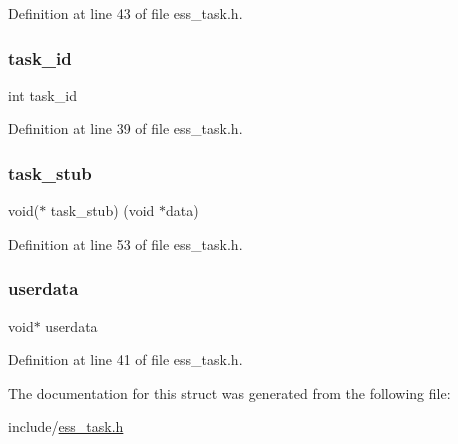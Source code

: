 Definition at line 43 of file ess\+\_\+task.\+h.

\mbox{\label{structess__platform__task_a24913131dc491a81c23f2b8246d85e3b}} 
\subsubsection{\texorpdfstring{task\+\_\+id}{task\_id}}
{\footnotesize\ttfamily int task\+\_\+id}



Definition at line 39 of file ess\+\_\+task.\+h.

\mbox{\label{structess__platform__task_a66859f9ee9fc430e9bf28644aea7c5c7}} 
\subsubsection{\texorpdfstring{task\+\_\+stub}{task\_stub}}
{\footnotesize\ttfamily void($\ast$  task\+\_\+stub) (void $\ast$data)}



Definition at line 53 of file ess\+\_\+task.\+h.

\mbox{\label{structess__platform__task_afd0ffb02780e738d4c0a10ab833b7834}} 
\subsubsection{\texorpdfstring{userdata}{userdata}}
{\footnotesize\ttfamily void$\ast$ userdata}



Definition at line 41 of file ess\+\_\+task.\+h.



The documentation for this struct was generated from the following file\+:\begin{DoxyCompactItemize}
\item 
include/\hyperlink{ess__task_8h}{ess\+\_\+task.\+h}\end{DoxyCompactItemize}
